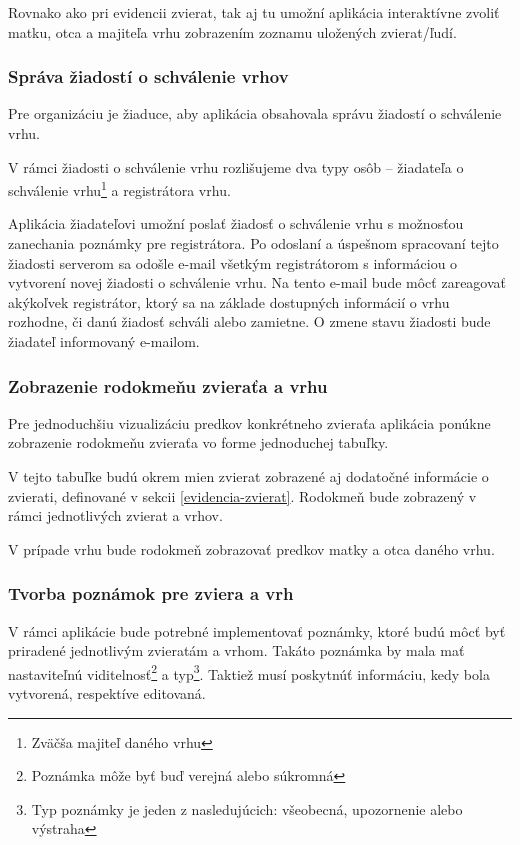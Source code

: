 Rovnako ako pri evidencii zvierat, tak aj tu umožní aplikácia interaktívne zvoliť matku, otca a majiteľa vrhu zobrazením zoznamu uložených zvierat/ľudí.

\subsubsection{Správa žiadostí o schválenie vrhov}\label{sprava-ziadosti-o-schvalenie-vrhu}
Pre organizáciu je žiaduce, aby aplikácia obsahovala správu žiadostí o schválenie vrhu.

V rámci žiadosti o schválenie vrhu rozlišujeme dva typy osôb -- žiadateľa o schválenie vrhu\footnote{Zväčša majiteľ daného vrhu} a registrátora vrhu.

Aplikácia žiadateľovi umožní poslať žiadosť o schválenie vrhu s možnosťou zanechania poznámky pre registrátora.
Po odoslaní a úspešnom spracovaní tejto žiadosti serverom sa odošle e-mail všetkým registrátorom s informáciou o vytvorení novej žiadosti o schválenie vrhu. Na tento e-mail bude môcť zareagovať akýkoľvek registrátor, ktorý sa na základe dostupných informácií o vrhu rozhodne, či danú žiadosť schváli alebo zamietne.
O zmene stavu žiadosti bude žiadateľ informovaný e-mailom.

\subsubsection{Zobrazenie rodokmeňu zvieraťa a vrhu}\label{rodokmene}
Pre jednoduchšiu vizualizáciu predkov konkrétneho zvieraťa aplikácia ponúkne zobrazenie rodokmeňu zvieraťa vo forme jednoduchej tabuľky.

V tejto tabuľke budú okrem mien zvierat zobrazené aj dodatočné informácie o zvierati, definované v sekcii \ref{evidencia-zvierat}. Rodokmeň bude zobrazený v rámci jednotlivých zvierat a vrhov.

V prípade vrhu bude rodokmeň zobrazovať predkov matky a otca daného vrhu.

\subsubsection{Tvorba poznámok pre zviera a vrh}
V rámci aplikácie bude potrebné implementovať poznámky, ktoré budú môcť byť priradené jednotlivým zvieratám a vrhom.
Takáto poznámka by mala mať nastaviteľnú viditelnosť\footnote{Poznámka môže byť buď verejná alebo súkromná} a typ\footnote{Typ poznámky je jeden z nasledujúcich: všeobecná, upozornenie alebo výstraha}.
Taktiež musí poskytnúť informáciu, kedy bola vytvorená, respektíve editovaná.


